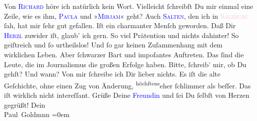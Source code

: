            \pstart
           Von \textsc{\textcolor{blue}{Richard}{}\ledrightnote{\textcolor{blue}{Richard Beer-Hofmann}}} höre ich natürlich kein Wort. Vielleicht ſchreibſt Du mir einmal eine Zeile,
               wie es ihm, \textsc{\textcolor{blue}{Paula}{}\ledrightnote{\textcolor{blue}{Paula Beer-Hofmann}}} und »\textsc{\textcolor{blue}{Mirjam}{}\ledrightnote{\textcolor{blue}{Mirjam Beer-Hofmann}}}« geht? Auch \textsc{\textcolor{blue}{Salten}{}\ledrightnote{\textcolor{blue}{Felix Salten}}}, den ich in \textsc{\textcolor{pink}{Salzburg}{}\ledrightnote{\textcolor{pink}{Salzburg}}} ſah, hat mir ſehr gut gefallen. Iſt ein charmanter Menſch geworden. Daß Dir \textsc{\textcolor{blue}{Herzl}{}\ledrightnote{\textcolor{blue}{Theodor Herzl}}} zuwider iſt, glaub’ ich gern. So viel Prätention und nichts dahinter! So
               geiſtreich und ſo urtheilslos! Und ſo gar keinen Zuſammenhang mit dem wirklichen  Leben. Aber ſchwarzer Bart und impoſantes
               Auftreten. Das ſind die Leute, die im Journalismus die großen Erfolge haben. {\pb}Bitte, ſchreib’ mir, ob Du \label{K_L02829-5v}\label{K_L02829-5h} gehſt? Und wann?\pend
           \pstart
           Von mir ſchreibe ich Dir lieber nichts. Es iſt die alte Geſchichte, ohne einen Zug
               von Änderung, \substVorne{}\textsuperscript{höchſtens}{\allowbreak}\substDazwischen{}eher\substHinten{} ſchlimmer als beſſer. Das iſt wirklich nicht intereſſant.\pend
           \pstart
           Grüße Deine \textcolor{blue}{Freundin}{} und ſei
               Du ſelbſt von Herzen gegrüßt!\pend
           \pstart
           Dein {\\[\baselineskip]}\spacefill\mbox{Paul Goldmnn}\pend
           \leftskip=0em{}\endnumbering{}\begin{anhang}\end{anhang}
      